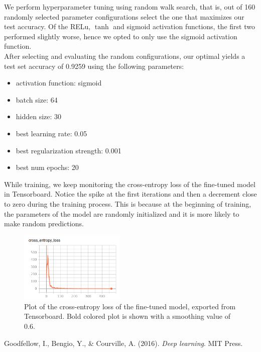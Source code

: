 \documentclass{article}
\begin{document}
We perform hyperparameter tuning using random walk search, that is, out of 160 randomly selected parameter configurations select the one that maximizes our test accuracy. Of the RELu, $\tanh$ and sigmoid activation functions, the first two performed slightly worse, hence we opted to only use the sigmoid activation function. \\

After selecting and evaluating the random configurations, our optimal yields a test set accuracy of 0.9259 using the following parameters: \\

\begin{itemize}
	\item activation function: sigmoid
	\item batch size: 64
	\item hidden size: 30
	\item best learning rate: 0.05
	\item best regularization strength: 0.001
	\item best num epochs: 20
\end{itemize}

While training, we keep monitoring the cross-entropy loss of the fine-tuned model in Tensorboard. Notice the spike at the first iterations and then a decrement close to zero during the training process. This is because at the beginning of training, the parameters of the model are randomly initialized and it is more likely to make random predictions.

	\begin{figure}
	\centering
	\includegraphics[width=0.45\textwidth]{images/tuned_loss.png}
	\caption{Plot of the cross-entropy loss of the fine-tuned model, exported from Tensorboard. Bold colored plot is shown with a smoothing value of 0.6.}
\end{figure}


\begin{thebibliography}{}
	 Goodfellow, I., Bengio, Y., \& Courville, A. (2016). \textit{Deep learning}. MIT Press.
\end{thebibliography}
\end{document}

